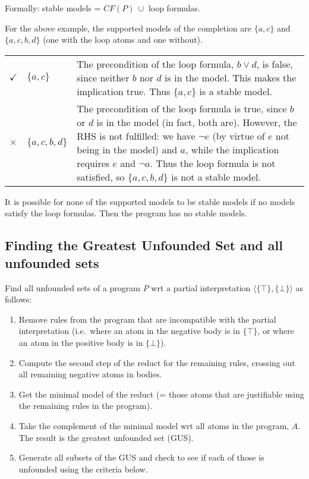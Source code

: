 \documentclass[9pt,a4paper,landscape]{article}
\begin{document}
{\vspace{\baselineskip}

Formally: stable models = $CF(P)\ \cup$ loop formulas.

\vspace{\baselineskip}

For the above example, the supported models of the completion are $\{a, c\}$ and $\{a, c, b, d\}$ (one with the loop atoms and one without).

\begin{center}
	\begin{tabular}{llp{20cm}}
		$\checkmark$ & $\{a, c\}$ & The precondition of the loop formula, $b \lor d$, is false, since neither $b$ nor $d$ is in the model. This makes the implication true. Thus $\{a, c\}$ is a stable model. \\
		$\times$ & $\{a, c, b, d\}$ & The precondition of the loop formula is true, since $b$ or $d$ is in the model (in fact, both are). However, the RHS is not fulfilled: we have $\neg e$ (by virtue of $e$ not being in the model) and $a$, while the implication requires $e$ and $\neg a$. Thus the loop formula is not satisfied, so $\{a, c, b, d\}$ is not a stable model.\\
	\end{tabular}
\end{center}

It is possible for none of the supported models to be stable models if no models satisfy the loop formulas. Then the program has no stable models.

\pagebreak


\subsection{Finding the Greatest Unfounded Set and all unfounded sets}
\label{subsec:unf}

Find all unfounded sets of a program $P$ wrt a partial interpretation $\langle \{\top\}, \{\bot\} \rangle$ as follows:
\begin{enumerate}[noitemsep]
	\item Remove rules from the program that are incompatible with the partial interpretation (i.e.\ where an atom in the negative body is in $\{\top\}$, or where an atom in the positive body is in $\{\bot\}$).
	\item Compute the second step of the reduct for the remaining rules, crossing out all remaining negative atoms in bodies.
	\item Get the minimal model of the reduct (= those atoms that are justifiable using the remaining rules in the program).
	\item Take the complement of the minimal model wrt all atoms in the program, $A$. The result is the greatest unfounded set (GUS).
	\item Generate all subsets of the GUS and check to see if each of those is unfounded using the criteria below.
\end{enumerate}

}
\end{document}
